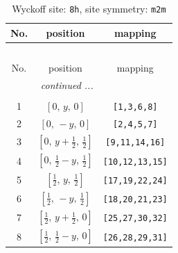 \documentclass[fleqn,8pt]{jsarticle}
\begin{document}
\begin{longtable}{ccc}
\caption{Wyckoff site: {\tt 8h}, site symmetry: {\tt m2m}}
 \\
 \hline \hline
No. & position & mapping \\ \hline \endfirsthead

\multicolumn{2}{l}{\tablename\ \thetable{}} \\
 \hline \hline
No. & position & mapping \\ \hline \endhead

 \hline \hline
\multicolumn{2}{r}{\footnotesize\it continued ...} \\ \endfoot

 \hline \hline
\multicolumn{2}{r}{} \\ \endlastfoot

1 & $\left[ 0,\, y,\, 0 \right]$ & {\tt [1,3,6,8]} \\ \hline
2 & $\left[ 0,\, - y,\, 0 \right]$ & {\tt [2,4,5,7]} \\ \hline
3 & $\left[ 0,\, y + \frac{1}{2},\, \frac{1}{2} \right]$ & {\tt [9,11,14,16]} \\ \hline
4 & $\left[ 0,\, \frac{1}{2} - y,\, \frac{1}{2} \right]$ & {\tt [10,12,13,15]} \\ \hline
5 & $\left[ \frac{1}{2},\, y,\, \frac{1}{2} \right]$ & {\tt [17,19,22,24]} \\ \hline
6 & $\left[ \frac{1}{2},\, - y,\, \frac{1}{2} \right]$ & {\tt [18,20,21,23]} \\ \hline
7 & $\left[ \frac{1}{2},\, y + \frac{1}{2},\, 0 \right]$ & {\tt [25,27,30,32]} \\ \hline
8 & $\left[ \frac{1}{2},\, \frac{1}{2} - y,\, 0 \right]$ & {\tt [26,28,29,31]} \\
\end{longtable}
\renewcommand{\arraystretch}{1.2}
\end{document}
